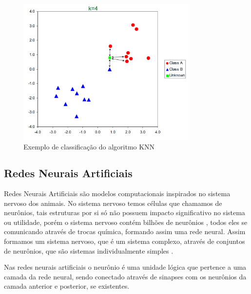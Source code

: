 \documentclass[
	12pt,				%
	openright,			%
	oneside,
	a4paper,			%
	english,			%
	french,				%
	spanish,			%
	brazil				%
	]{abntex2}
\begin{document}
    \begin{figure}[ht]
        \advance{}\textwidth
        \caption{\label{fig_knn}Exemplo de classificação do algoritmo KNN}
        \includegraphics[width=0.8\textwidth]{knn.png}
    \end{figure}
\newpage
\subsection{Redes Neurais Artificiais}
    Redes Neurais Artificiais são modelos computacionais inspirados no sistema nervoso dos animais. No sistema nervoso temos células que chamamos de neurônios, tais estruturas por si só não possuem impacto significativo no sistema ou utilidade, porém o sistema nervoso contém  bilhões de neurônios \cite{lent2004cem}, todos eles se comunicando através de trocas química, formando assim uma rede neural. Assim formamos um sistema nervoso, que é um sistema complexo, através de conjuntos de neurônios, que são sistemas individualmente simples  . 

    Nas redes neurais artificiais o neurônio é uma unidade lógica que pertence a uma camada da rede neural, sendo conectado através de sinapses com os neurônios da camada anterior e posterior, se existentes.
    
\end{document}
